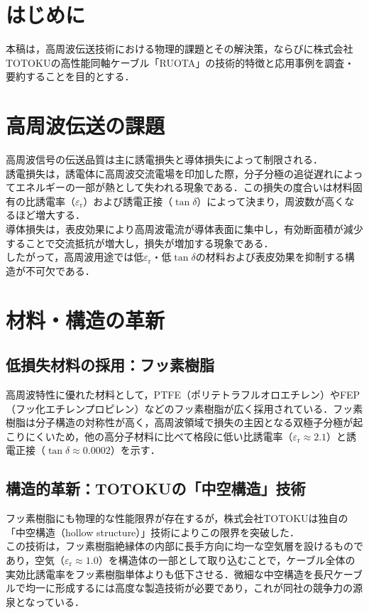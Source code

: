 \documentclass[11pt,a4paper]{ltjsarticle}
\newcommand{\supcite}[1]{\textsuperscript{\cite{#1}}}
\begin{document}

\section{はじめに}
本稿は，高周波伝送技術における物理的課題とその解決策，ならびに株式会社TOTOKUの高性能同軸ケーブル「RUOTA」の技術的特徴と応用事例を調査・要約することを目的とする．

\section{高周波伝送の課題}
高周波信号の伝送品質は主に誘電損失と導体損失によって制限される．\\
誘電損失は，誘電体に高周波交流電場を印加した際，分子分極の追従遅れによってエネルギーの一部が熱として失われる現象である．この損失の度合いは材料固有の比誘電率（$\varepsilon_{\mathrm{r}}$）および誘電正接（$\tan\delta$）によって決まり，周波数が高くなるほど増大する．\\
導体損失は，表皮効果により高周波電流が導体表面に集中し，有効断面積が減少することで交流抵抗が増大し，損失が増加する現象である．\\
したがって，高周波用途では低$\varepsilon_{\mathrm{r}}$・低$\tan\delta$の材料および表皮効果を抑制する構造が不可欠である．

\section{材料・構造の革新}
\subsection{低損失材料の採用：フッ素樹脂}
高周波特性に優れた材料として，PTFE（ポリテトラフルオロエチレン）やFEP（フッ化エチレンプロピレン）などのフッ素樹脂が広く採用されている．フッ素樹脂は分子構造の対称性が高く，高周波領域で損失の主因となる双極子分極が起こりにくいため，他の高分子材料に比べて格段に低い比誘電率（$\varepsilon_{\mathrm{r}}\approx2.1$）と誘電正接（$\tan\delta\approx0.0002$）を示す\supcite{ref12}．

\subsection{構造的革新：TOTOKUの「中空構造」技術}
フッ素樹脂にも物理的な性能限界が存在するが，株式会社TOTOKUは独自の「中空構造（hollow structure）」技術によりこの限界を突破した\supcite{ref13}．\\
この技術は，フッ素樹脂絶縁体の内部に長手方向に均一な空気層を設けるものであり，空気（$\varepsilon_{\mathrm{r}}\approx1.0$）を構造体の一部として取り込むことで，ケーブル全体の実効比誘電率をフッ素樹脂単体よりも低下させる．微細な中空構造を長尺ケーブルで均一に形成するには高度な製造技術が必要であり，これが同社の競争力の源泉となっている\supcite{ref14}．
\end{document}
